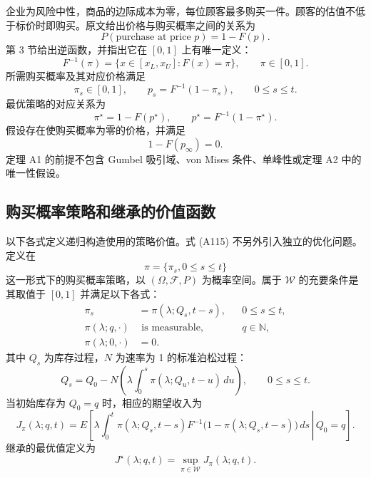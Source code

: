 \documentclass{article}
\begin{document}
企业为风险中性，商品的边际成本为零，每位顾客最多购买一件。顾客的估值不低于标价时即购买。原文给出价格与购买概率之间的关系为
\[
P(\text{purchase at price }p)=1-F(p).
\]
第 3 节给出逆函数，并指出它在 $[0,1]$ 上有唯一定义：
\[
F^{-1}(\pi)=\{x\in[x_L,x_U]:F(x)=\pi\},\qquad \pi\in[0,1].
\]
所需购买概率及其对应价格满足
\[
\pi_s\in[0,1],\qquad
p_s=F^{-1}(1-\pi_s),\qquad 0\leq s\leq t.
\]
最优策略的对应关系为
\[
\pi^\star=1-F(p^\star),\qquad
p^\star=F^{-1}(1-\pi^\star).
\]
假设存在使购买概率为零的价格，并满足
\[
1-F(p_\infty)=0.
\]
定理 A1 的前提不包含 Gumbel 吸引域、von Mises 条件、单峰性或定理 A2 中的唯一性假设。

\subsection*{购买概率策略和继承的价值函数}
以下各式定义递归构造使用的策略价值。式 (A115) 不另外引入独立的优化问题。定义在
\[
\pi=\{\pi_s,0\leq s\leq t\}
\]
这一形式下的购买概率策略，以 $(\Omega,\mathcal F,P)$ 为概率空间。属于 $\mathcal W$ 的充要条件是其取值于 $[0,1]$ 并满足以下各式：
\[
\begin{aligned}
\pi_s&=\pi(\lambda;Q_s,t-s),&&0\leq s\leq t,\\
\pi(\lambda;q,\cdot)&\text{ is measurable},&&q\in\mathbb N,\\
\pi(\lambda;0,\cdot)&=0.
\end{aligned}
\]
其中 $Q_s$ 为库存过程，$N$ 为速率为 1 的标准泊松过程：
\begin{equation}
Q_s=Q_0-N\left(\lambda\int_0^s\pi(\lambda;Q_u,t-u)\,du\right),
\qquad 0\leq s\leq t.
\tag{A108}
\end{equation}
当初始库存为 $Q_0=q$ 时，相应的期望收入为
\begin{equation}
J_\pi(\lambda;q,t)
=E\left[\left.
\lambda\int_0^t\pi(\lambda;Q_s,t-s)
F^{-1}\bigl(1-\pi(\lambda;Q_s,t-s)\bigr)\,ds
\,\right|\,Q_0=q\right].
\tag{A107}
\end{equation}
继承的最优值定义为
\begin{equation}
J^\star(\lambda;q,t)=\sup_{\pi\in\mathcal W}J_\pi(\lambda;q,t).
\tag{A109}
\end{equation}
\end{document}
